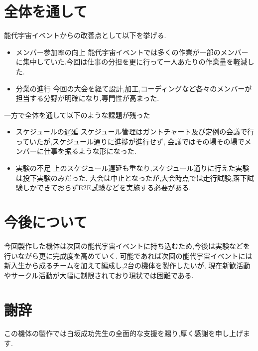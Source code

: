 \part*{全体を通して}
能代宇宙イベントからの改善点として以下を挙げる.
\begin{itemize}
\item メンバー参加率の向上\newline
能代宇宙イベントでは多くの作業が一部のメンバーに集中していた.今回は仕事の分担を更に行って一人あたりの作業量を軽減した.
\item 分業の進行\newline
今回の大会を経て設計,加工,コーディングなど各々のメンバーが担当する分野が明確になり,専門性が高まった.
\end{itemize}
一方で全体を通して以下のような課題が残った
\begin{itemize}
\item スケジュールの遅延\newline
スケジュール管理はガントチャート及び定例の会議で行っていたが,スケジュール通りに進捗が進行せず,
会議ではその場その場でメンバーに仕事を振るような形になった.
\item 実験の不足\newline
上のスケジュール遅延も重なり,スケジュール通りに行えた実験は投下実験のみだった.
大会は中止となったが,大会時点では走行試験,落下試験しかできておらずE2E試験などを実施する必要がある.
\end{itemize}
\part*{今後について}
今回製作した機体は次回の能代宇宙イベントに持ち込むため,今後は実験などを行いながら更に完成度を高めていく.
可能であれば次回の能代宇宙イベントには新入生から成るチームを加えて編成し,2台の機体を製作したいが,
現在新歓活動やサークル活動が大幅に制限されており現状では困難である.
\part*{謝辞}
この機体の製作では白坂成功先生の全面的な支援を賜り,厚く感謝を申し上げます.
